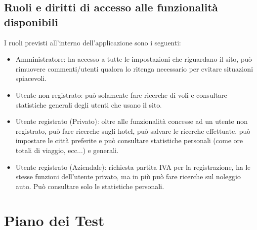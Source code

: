\documentclass[11pt]{article}
\begin{document}
\subsection{Ruoli e diritti di accesso alle funzionalità disponibili}
I ruoli previsti all’interno dell’applicazione sono i seguenti:
\begin{itemize}
	\item Amministratore: ha accesso a tutte le impostazioni che riguardano il sito, può rimuovere commenti/utenti qualora lo ritenga necessario per evitare situazioni spiacevoli.
	\item Utente non registrato: può solamente fare ricerche di voli e consultare statistiche generali degli utenti che usano il sito.
	\item Utente registrato (Privato): oltre alle funzionalità concesse ad un utente non registrato, può fare ricerche sugli hotel, può salvare le ricerche effettuate, può impostare le città preferite e può consultare statistiche personali (come ore totali di viaggio, ecc...) e generali.
	\item Utente registrato (Aziendale): richiesta partita IVA per la registrazione, ha le stesse funzioni dell’utente privato, ma in più può fare ricerche sul noleggio auto. Può consultare solo le statistiche personali.
\end{itemize}

\section{Piano dei Test}
\end{document}
